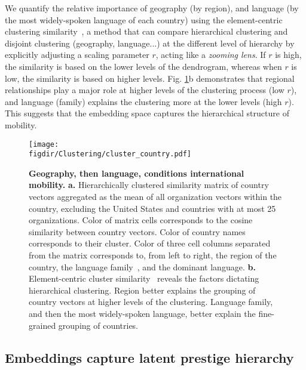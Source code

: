 \documentclass[12pt]{article} %
\def\figdir{../Figs}
\begin{document}
We quantify the relative importance of geography (by region), and language (by the most widely-spoken language of each country) using the element-centric clustering similarity~\autocite{gates2019element}, a method that can compare hierarchical clustering and disjoint clustering (geography, language...) at the different level of hierarchy by explicitly adjusting a scaling parameter $r$, acting like a \textit{zooming lens}.
If $r$ is high, the similarity is based on the lower levels of the dendrogram, whereas when $r$ is low, the similarity is based on higher levels.
Fig. \ref{fig:clustering}b demonstrates that regional relationships play a major role at higher levels of the clustering process (low $r$), and language (family) explains the clustering more at the lower levels (high $r$).
This suggests that the embedding space captures the hierarchical structure of mobility.


%
%
\begin{figure}[p!]
	\centering
	\texttt{[image: \\figdir/Clustering/cluster\_country.pdf]}
	\caption{
		\textbf{Geography, then language, conditions international mobility.}
		\textbf{a.} Hierarchically clustered similarity matrix of country vectors aggregated as the mean of all organization vectors within the country, excluding the United States and countries with at most 25 organizations.
		Color of matrix cells corresponds to the cosine similarity between country vectors.
		Color of country names corresponds to their cluster.
		Color of three cell columns separated from the matrix corresponds to, from left to right, the region of the country, the language family~\autocite{ethnologue}, and the dominant language.
		\textbf{b.}	Element-centric cluster similarity~\autocite{gates2019element} reveals the factors dictating hierarchical clustering.
		Region better explains the grouping of country vectors at higher levels of the clustering.
		Language family, and then the most widely-spoken language, better explain the fine-grained grouping of countries.
	}
	\label{fig:clustering}
\end{figure}



%
%
\subsection*{Embeddings capture latent prestige hierarchy}
\end{document}
